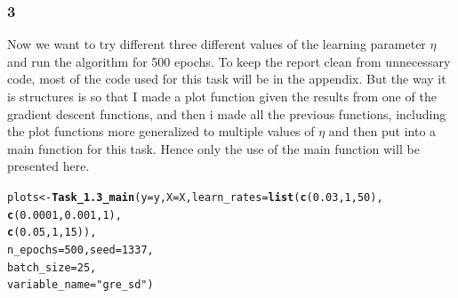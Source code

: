 \documentclass[11pt, a4paper, english]{article}\usepackage[]{graphicx}\usepackage[dvipsnames]{xcolor}
\makeatletter
\newcommand{\hlnum}[1]{\textcolor[rgb]{0.686,0.059,0.569}{#1}}%
\newcommand{\hlstr}[1]{\textcolor[rgb]{0.192,0.494,0.8}{#1}}%
\newcommand{\hlstd}[1]{\textcolor[rgb]{0.345,0.345,0.345}{#1}}%
\newcommand{\hlkwb}[1]{\textcolor[rgb]{0.69,0.353,0.396}{#1}}%
\newcommand{\hlkwc}[1]{\textcolor[rgb]{0.333,0.667,0.333}{#1}}%
\newcommand{\hlkwd}[1]{\textcolor[rgb]{0.737,0.353,0.396}{\textbf{#1}}}%
\newenvironment{kframe}{%
 \def\at@end@of@kframe{}%
 \ifinner\ifhmode%
  \def\at@end@of@kframe{\end{minipage}}%
  \begin{minipage}{\columnwidth}%
 \fi\fi%
 \def\FrameCommand##1{\hskip\@totalleftmargin \hskip-\fboxsep
 \colorbox{shadecolor}{##1}\hskip-\fboxsep
     \hskip-\linewidth \hskip-\@totalleftmargin \hskip\columnwidth}%
 \MakeFramed {\advance\hsize-\width
   \@totalleftmargin\z@ \linewidth\hsize
   \@setminipage}}%
 {\par\unskip\endMakeFramed%
 \at@end@of@kframe}
\newenvironment{knitrout}{}{} %
\makeatother
\begin{document}
\subsubsection{3}
Now we want to try different three different values of the learning parameter $\eta$ and run the algorithm for 500 epochs.
To keep the report clean from unnecessary code, most of the code used for this task will be in the appendix. But the way it is structures is so that I made a plot function given the results from one of the gradient descent functions, and then i made all the previous functions, including the plot functions more generalized to multiple values of $\eta$ and then put into a main function for this task. Hence only the use of the main function will be presented here. 







\begin{knitrout}
\color{fgcolor}\begin{kframe}
\begin{alltt}
\hlstd{plots} \hlkwb{<-} \hlkwd{Task_1.3_main}\hlstd{(}\hlkwc{y}\hlstd{=y,}\hlkwc{X}\hlstd{=X,} \hlkwc{learn_rates} \hlstd{=} \hlkwd{list}\hlstd{(}\hlkwd{c}\hlstd{(}\hlnum{0.03}\hlstd{,}\hlnum{1}\hlstd{,}\hlnum{50}\hlstd{),}
                                                 \hlkwd{c}\hlstd{(}\hlnum{0.0001}\hlstd{,} \hlnum{0.001}\hlstd{,} \hlnum{1}\hlstd{),}
                                                 \hlkwd{c}\hlstd{(}\hlnum{0.05}\hlstd{,}\hlnum{1}\hlstd{,}\hlnum{15}\hlstd{)),}
                     \hlkwc{n_epochs}\hlstd{=}\hlnum{500}\hlstd{,} \hlkwc{seed}\hlstd{=}\hlnum{1337}\hlstd{,}
                     \hlkwc{batch_size} \hlstd{=} \hlnum{25}\hlstd{,}
                     \hlkwc{variable_name} \hlstd{=} \hlstr{"gre_sd"}\hlstd{)}
\end{alltt}
\end{kframe}
\end{knitrout}
\end{document}
